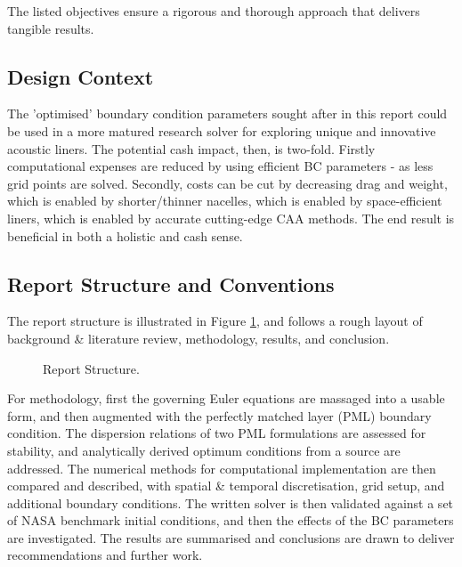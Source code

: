 The listed objectives ensure a rigorous and thorough approach that delivers tangible results. 

\newpage

\subsection{Design Context}


The 'optimised' boundary condition parameters sought after in this report could be used in a more matured research solver for exploring unique and innovative acoustic liners. The potential cash impact, then, is two-fold. Firstly computational expenses are reduced by using efficient BC parameters - as less grid points are solved. Secondly, costs can be cut by decreasing drag and weight, which is enabled by shorter/thinner nacelles, which is enabled by space-efficient liners, which is enabled by accurate cutting-edge CAA methods. The end result is beneficial in both a holistic and cash sense.


\subsection{Report Structure and Conventions}

The report structure is illustrated in Figure \ref{fig:ReportStructure}, and follows a rough layout of background \& literature review, methodology, results, and conclusion. 

\begin{figure}[h!]
\centering
{}
\caption{Report Structure.}
\label{fig:ReportStructure}
\end{figure}

For methodology, first the governing Euler equations are massaged into a usable form, and then augmented with the perfectly matched layer (PML) boundary condition. The dispersion relations of two PML formulations are assessed for stability, and analytically derived optimum conditions from a source are addressed. The numerical methods for computational implementation are then compared and described, with spatial \& temporal discretisation, grid setup, and additional boundary conditions. The written solver is then validated against a set of NASA benchmark initial conditions, and then the effects of the BC parameters are investigated. The results are summarised and conclusions are drawn to deliver recommendations and further work.

